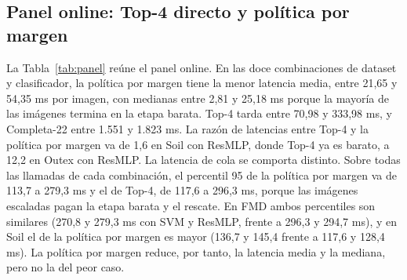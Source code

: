 \documentclass[a4paper,fleqn]{cas-sc}
\begin{document}
\subsection{Panel online: Top-4 directo y política por margen}\label{sec:panel}

La Tabla~\ref{tab:panel} reúne el panel online. En las doce combinaciones de dataset y clasificador, la política por margen tiene la menor latencia media, entre 21,65 y 54,35 ms por imagen, con medianas entre 2,81 y 25,18 ms porque la mayoría de las imágenes termina en la etapa barata. Top-4 tarda entre 70,98 y 333,98 ms, y Completa-22 entre 1.551 y 1.823 ms. La razón de latencias entre Top-4 y la política por margen va de 1,6 en Soil con ResMLP, donde Top-4 ya es barato, a 12,2 en Outex con ResMLP. La latencia de cola se comporta distinto. Sobre todas las llamadas de cada combinación, el percentil 95 de la política por margen va de 113,7 a 279,3 ms y el de Top-4, de 117,6 a 296,3 ms, porque las imágenes escaladas pagan la etapa barata y el rescate. En FMD ambos percentiles son similares (270,8 y 279,3 ms con SVM y ResMLP, frente a 296,3 y 294,7 ms), y en Soil el de la política por margen es mayor (136,7 y 145,4 frente a 117,6 y 128,4 ms). La política por margen reduce, por tanto, la latencia media y la mediana, pero no la del peor caso.
\end{document}
